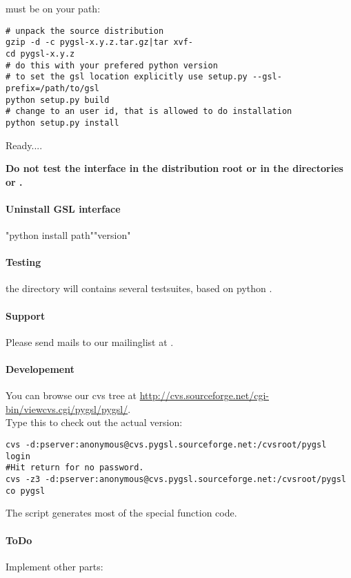  must be on your path:\nopagebreak
\begin{verbatim}
# unpack the source distribution
gzip -d -c pygsl-x.y.z.tar.gz|tar xvf-
cd pygsl-x.y.z
# do this with your prefered python version
# to set the gsl location explicitly use setup.py --gsl-prefix=/path/to/gsl
python setup.py build
# change to an user id, that is allowed to do installation
python setup.py install
\end{verbatim}
Ready....

{\bf Do not test the interface in the distribution root or in the directories  or .}

\paragraph*{Uninstall GSL interface}
"python install path""version"

\paragraph*{Testing}
the directory  will contains several testsuites, based on python .

\paragraph*{Support}
Please send mails to our mailinglist at .

\paragraph*{Developement}
You can browse our cvs tree at \url{http://cvs.sourceforge.net/cgi-bin/viewcvs.cgi/pygsl/pygsl/}.
\\
Type this to check out the actual version:
\begin{verbatim}
cvs -d:pserver:anonymous@cvs.pygsl.sourceforge.net:/cvsroot/pygsl login
#Hit return for no password.
cvs -z3 -d:pserver:anonymous@cvs.pygsl.sourceforge.net:/cvsroot/pygsl co pygsl
\end{verbatim}
The script  generates most of the special function code.

\paragraph*{ToDo}
Implement other parts:

